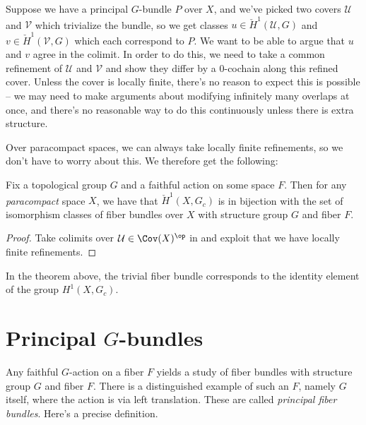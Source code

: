 \documentclass[11pt]{book}
\begin{document}
\begin{remark} Suppose we have a principal $G$-bundle $P$ over $X$, and we've picked two covers $\mathcal{U}$ and $\mathcal{V}$ which trivialize the bundle, so we get classes $u\in \check{H}^1(\mathcal{U},G)$ and $v \in \check{H}^1(\mathcal{V},G)$ which each correspond to $P$. We want to be able to argue that $u$ and $v$ agree in the colimit. In order to do this, we need to take a common refinement of $\mathcal{U}$ and $\mathcal{V}$ and show they differ by a 0-cochain along this refined cover. Unless the cover is locally finite, there's no reason to expect this is possible -- we may need to make arguments about modifying infinitely many overlaps at once, and there's no reasonable way to do this continuously unless there is extra structure.
\end{remark}

Over paracompact spaces, we can always take locally finite refinements, so we don't have to worry about this. We therefore get the following:

\begin{theorem}\label{thm:H1-bijection-with-fiber-bundles} 
Fix a topological group $G$ and a faithful action on some space $F$. Then for any \emph{paracompact} space $X$, we have that $\check{H}^1(X,G_c)$ is in bijection with the set of isomorphism classes of fiber bundles over $X$ with structure group $G$ and fiber $F$.
\end{theorem}
\begin{proof} Take colimits over $\mathcal{U}\in \Cov(X)^\op$ in  and exploit that we have locally finite refinements.
\end{proof}

\begin{example}
In the theorem above, the trivial fiber bundle corresponds to the identity element of the group $H^1(X,G_c)$.
\end{example}


\section{Principal \texorpdfstring{$G$}{G}-bundles}

Any faithful $G$-action on a fiber $F$ yields a study of fiber bundles with structure group $G$ and fiber $F$. There is a distinguished example of such an $F$, namely $G$ itself, where the action is via left translation. These are called \emph{principal fiber bundles}. Here's a precise definition.
\end{document}
